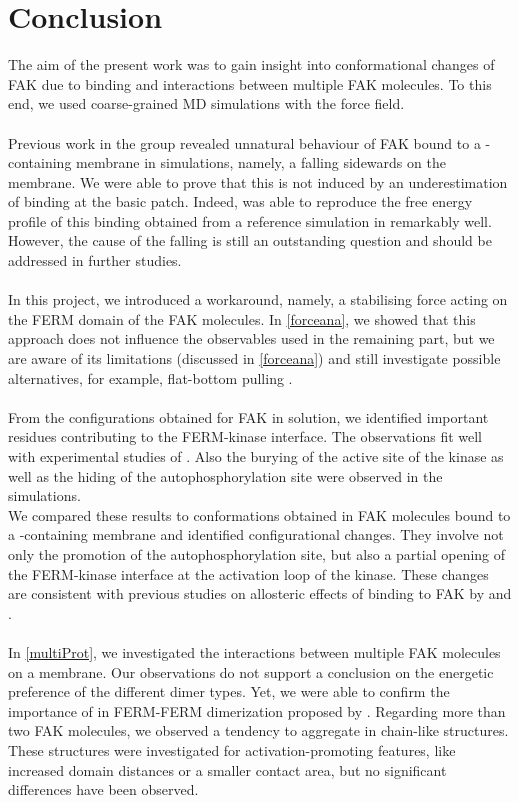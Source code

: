 \chapter{Conclusion}
The aim of the present work was to gain insight into conformational changes of FAK due to \pip{} binding and interactions between multiple FAK molecules. To this end, we used coarse-grained MD simulations with the \martini{} force field.\\
\\
Previous work in the group revealed unnatural behaviour of FAK bound to a \pip{}-containing membrane in \martini{} simulations, namely, a falling sidewards on the membrane. We were able to prove that this is not induced by an underestimation of \pip{} binding at the basic patch. Indeed, \martini{} was able to reproduce the free energy profile of this binding obtained from a reference simulation in \charmm{} remarkably well. However, the cause of the falling is still an outstanding question and should be addressed in further studies.\\ %
\\
In this project, we introduced a workaround, namely, a stabilising force acting on the FERM domain of the FAK molecules. In \autoref{forceana}, we showed that this approach does not influence the observables used in the remaining part, but we are aware of its limitations (discussed in \autoref{forceana}) and still investigate possible alternatives, for example, flat-bottom pulling \autocite[p. 156-158]{gromacsManual}.\\
\\
From the configurations obtained for FAK in solution, we identified important residues contributing to the FERM-kinase interface. The observations fit well with experimental studies of \textcite{structFAK}. Also the burying of the active site of the kinase as well as the hiding of the autophosphorylation site were observed in the simulations.\\
We compared these results to conformations obtained in FAK molecules bound to a \pip{}-containing membrane and identified configurational changes. They involve not only the promotion of the autophosphorylation site, but also a partial opening of the FERM-kinase interface at the activation loop of the kinase. These changes are consistent with previous studies on allosteric effects of \pip{} binding to FAK by \textcite{pap001} and \textcite{pap003}.\\
\\
In \autoref{multiProt}, we investigated the interactions between multiple FAK molecules on a membrane. Our observations do not support a conclusion on the energetic preference of the different dimer types. Yet, we were able to confirm the importance of  in FERM-FERM dimerization proposed by \textcite{fakdimers}. Regarding more than two FAK molecules, we observed a tendency to aggregate in chain-like structures. These structures were investigated for activation-promoting features, like increased domain distances or a smaller contact area, but no significant differences have been observed.\\
